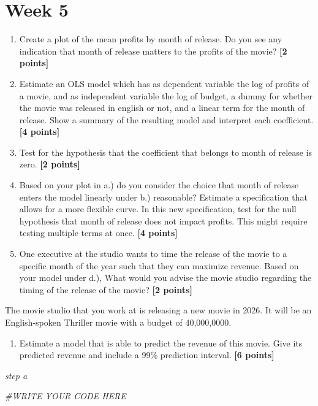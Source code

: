 \documentclass[
]{article}
\newenvironment{Shaded}{\begin{snugshade}}{\end{snugshade}}
\newcommand{\CommentTok}[1]{\textcolor[rgb]{0.56,0.35,0.01}{\textit{#1}}}
\providecommand{\tightlist}{%
  \setlength{\itemsep}{0pt}\setlength{\parskip}{0pt}}
\begin{document}
\section{Week 5}\label{week-5}

\begin{enumerate}
\def\labelenumi{\alph{enumi}.}
\item
  Create a plot of the mean profits by month of release. Do you see any
  indication that month of release matters to the profits of the movie?
  \textbf{[2 points]}
\item
  Estimate an OLS model which has as dependent variable the log of
  profits of a movie, and as independent variable the log of budget, a
  dummy for whether the movie was released in english or not, and a
  linear term for the month of release. Show a summary of the resulting
  model and interpret each coefficient. \textbf{[4 points]}
\item
  Test for the hypothesis that the coefficient that belongs to month of
  release is zero. \textbf{[2 points]}
\item
  Based on your plot in a.) do you consider the choice that month of
  release enters the model linearly under b.) reasonable? Estimate a
  specification that allows for a more flexible curve. In this new
  specification, test for the null hypothesis that month of release does
  not impact profits. This might require testing multiple terms at once.
  \textbf{[4 points]}
\item
  One executive at the studio wants to time the release of the movie to
  a specific month of the year such that they can maximize revenue.
  Based on your model under d.), What would you advise the movie studio
  regarding the timing of the release of the movie? \textbf{[2 points]}
\end{enumerate}

The movie studio that you work at is releasing a new movie in 2026. It
will be an English-spoken Thriller movie with a budget of 40,000,0000.

\begin{enumerate}
\def\labelenumi{\alph{enumi}.}
\setcounter{enumi}{5}
\tightlist
\item
  Estimate a model that is able to predict the revenue of this movie.
  Give its predicted revenue and include a 99\% prediction interval.
  \textbf{[6 points]}
\end{enumerate}

\emph{step a}

\begin{Shaded}
\begin{Highlighting}[]
\CommentTok{\#WRITE YOUR CODE HERE}
\end{Highlighting}
\end{Shaded}
\end{document}
